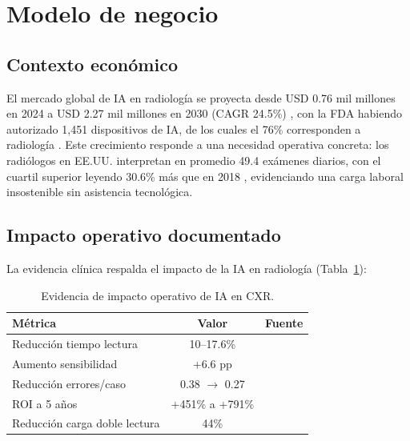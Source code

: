 \section{Modelo de negocio}
\label{sec:business-model}

\subsection{Contexto econ\'omico}

El mercado global de IA en radiolog\'ia se proyecta desde USD 0.76 mil millones en 2024 a USD 2.27 mil millones en 2030 (CAGR 24.5\%) \cite{marketsandmarkets2025}, con la FDA habiendo autorizado 1,451 dispositivos de IA, de los cuales el 76\% corresponden a radiolog\'ia \cite{fda2026aidevices}. Este crecimiento responde a una necesidad operativa concreta: los radi\'ologos en EE.UU. interpretan en promedio 49.4 ex\'amenes diarios, con el cuartil superior leyendo 30.6\% m\'as que en 2018 \cite{mcdonald2015workload}, evidenciando una carga laboral insostenible sin asistencia tecnol\'ogica.

\subsection{Impacto operativo documentado}

La evidencia cl\'inica respalda el impacto de la IA en radiolog\'ia (Tabla~\ref{tab:impact}):

\begin{table}[H]
\centering
\caption{Evidencia de impacto operativo de IA en CXR.}
\label{tab:impact}
\small
\begin{tabular}{lcc}
\toprule
\textbf{M\'etrica} & \textbf{Valor} & \textbf{Fuente} \\
\midrule
Reducci\'on tiempo lectura & 10--17.6\% & \cite{shin2023ai} \\
Aumento sensibilidad & +6.6 pp & \cite{ahn2022lunit} \\
Reducci\'on errores/caso & 0.38 $\to$ 0.27 & \cite{kapoor2025workflow} \\
ROI a 5 a\~nos & +451\% a +791\% & \cite{vanleeuwen2024roi} \\
Reducci\'on carga doble lectura & 44\% & \cite{lang2023masai} \\
\bottomrule
\end{tabular}
\end{table}

